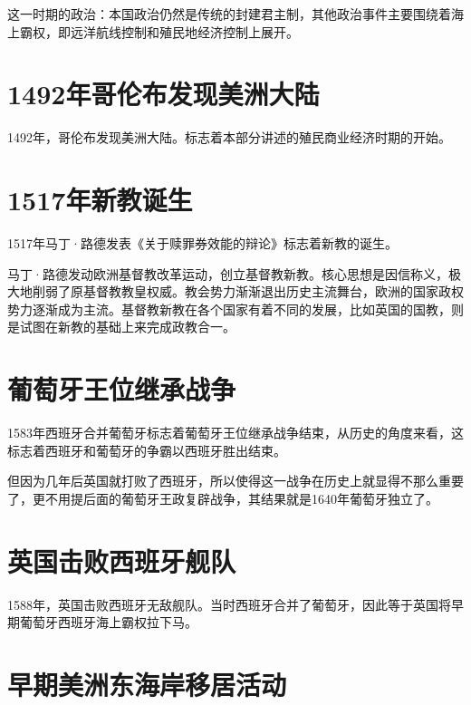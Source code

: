 \documentclass[12pt,oneside]{book}
\begin{document}
这一时期的政治：本国政治仍然是传统的封建君主制，其他政治事件主要围绕着海上霸权，即远洋航线控制和殖民地经济控制上展开。



\chapter{1492年哥伦布发现美洲大陆}
1492年，哥伦布发现美洲大陆。标志着本部分讲述的殖民商业经济时期的开始。

\chapter{1517年新教诞生}
1517年马丁·路德发表《关于赎罪券效能的辩论》标志着新教的诞生。

马丁·路德发动欧洲基督教改革运动，创立基督教新教。核心思想是因信称义，极大地削弱了原基督教教皇权威。教会势力渐渐退出历史主流舞台，欧洲的国家政权势力逐渐成为主流。基督教新教在各个国家有着不同的发展，比如英国的国教，则是试图在新教的基础上来完成政教合一。




\chapter{葡萄牙王位继承战争}
1583年西班牙合并葡萄牙标志着葡萄牙王位继承战争结束，从历史的角度来看，这标志着西班牙和葡萄牙的争霸以西班牙胜出结束。

但因为几年后英国就打败了西班牙，所以使得这一战争在历史上就显得不那么重要了，更不用提后面的葡萄牙王政复辟战争，其结果就是1640年葡萄牙独立了。



\chapter{英国击败西班牙舰队}
1588年，英国击败西班牙无敌舰队。当时西班牙合并了葡萄牙，因此等于英国将早期葡萄牙西班牙海上霸权拉下马。



\chapter{早期美洲东海岸移居活动}
\end{document}
